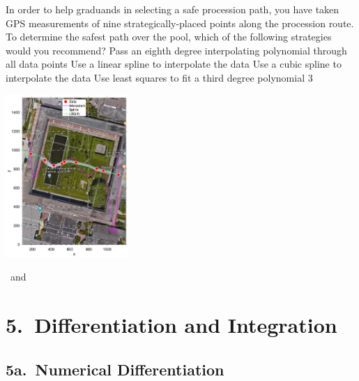 \documentclass[10pt]{article}
\newcounter{totalQ}\setcounter{totalQ}{1}
\newcommand{\mysecnum}{0}
\newcommand{\myhead}[2]{%
  \section*{{\sffamily\bfseries #1.~#2}}\renewcommand{\mysecnum}{#1}}
\newcommand{\mysubhead}[2]{%
  \subsection*{{\sffamily\bfseries #1.~#2}}\renewcommand{\mysecnum}{#1}}
\newenvironment{clicklist}{%
  \begin{enumerate}
    \renewcommand{\labelenumi}{{\sffamily\bfseries Q{\mysecnum}--\arabic{enumi}.}}
    \renewcommand{\labelenumi}{{\sffamily\bfseries Q{\mysecnum}--\arabic{enumi}${}^\text{\arabic{totalQ}}$.}}
    \setlength{\itemindent}{\widthof{Q}+\labelsep}
  }{%
  \end{enumerate}}
\begin{document}
\begin{clicklist}
{    In order to help graduands in selecting a safe procession path, you
    have taken GPS measurements of nine strategically-placed points
    along the procession route.  To determine the safest path over the
    pool, which of the following strategies would you recommend?}%
  {Pass an eighth degree interpolating polynomial through all data points}%
  {Use a linear spline to interpolate the data}%
  {Use a cubic spline to interpolate the data}%
  {Use least squares to fit a third degree polynomial}%
  {3}{\begin{center}
      \includegraphics[width=0.35\textwidth]{figures/sfuquad2}
    \end{center}}{\mah\ and \jms}
  
\end{clicklist}

\newpage
\myhead{5}{Differentiation and Integration}
\mysubhead{5a}{Numerical Differentiation}
\end{document}
